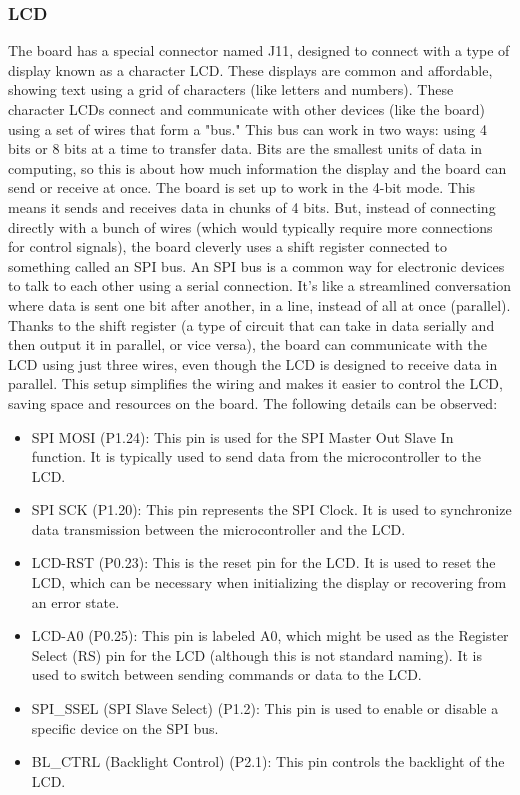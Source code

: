 \documentclass{cce2014-design}
\begin{document}
\subsubsection{LCD}
The board has a special connector named J11, designed to connect with a type of
display known as a character LCD. These displays are common and affordable,
showing text using a grid of characters (like letters and numbers). These
character LCDs connect and communicate with other devices (like the board)
using a set of wires that form a "bus." This bus can work in two ways: using 4
bits or 8 bits at a time to transfer data. Bits are the smallest units of data
in computing, so this is about how much information the display and the board
can send or receive at once. The board is set up to work in the 4-bit mode. This
means it sends and receives data in chunks of 4 bits. But, instead of connecting
directly with a bunch of wires (which would typically require more connections
for control signals), the board cleverly uses a shift register connected to
something called an SPI bus. An SPI bus is a common way for electronic devices
to talk to each other using a serial connection. It's like a streamlined
conversation where data is sent one bit after another, in a line, instead of all
at once (parallel). Thanks to the shift register (a type of circuit that can
take in data serially and then output it in parallel, or vice versa), the board
can communicate with the LCD using just three wires, even though the LCD is
designed to receive data in parallel. This setup simplifies the wiring and makes
it easier to control the LCD, saving space and resources on the board. The
following details can be observed:

\begin{itemize}
	\item SPI MOSI (P1.24): This pin is used for the SPI Master Out Slave In
        function. It is typically used to send data from the microcontroller to
	      the LCD.
	\item SPI SCK (P1.20): This pin represents the SPI Clock. It is used to
	    synchronize data transmission between the microcontroller and the LCD.
    \item LCD-RST (P0.23): This is the reset pin for the LCD. It is used to
        reset the LCD, which can be necessary when initializing the display or
        recovering from an error state.
	\item LCD-A0 (P0.25): This pin is labeled A0, which might be used as the
	    Register Select (RS) pin for the LCD (although this is not standard
	    naming). It is used to switch between sending commands or data to the
        LCD.
	\item SPI\_SSEL (SPI Slave Select) (P1.2): This pin is used to enable or
	    disable a specific device on the SPI bus.
	\item BL\_CTRL (Backlight Control) (P2.1): This pin controls the backlight
        of the LCD.
\end{itemize}
\end{document}
